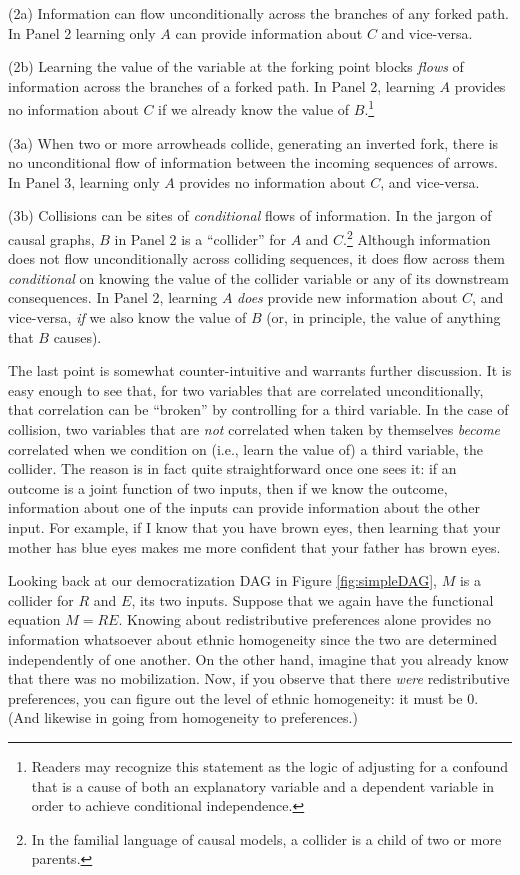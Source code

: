 \documentclass[12pt,]{book}
\let\rmarkdownfootnote\footnote%
\def\footnote{\protect\rmarkdownfootnote}
\begin{document}
(2a) Information can flow unconditionally across the branches of any forked path. In Panel 2 learning only \(A\) can provide information about \(C\) and vice-versa.

(2b) Learning the value of the variable at the forking point blocks \emph{flows} of information across the branches of a forked path. In Panel 2, learning \(A\) provides no information about \(C\) if we already know the value of \(B\).\footnote{Readers may recognize this statement as the logic of adjusting for a confound that is a cause of both an explanatory variable and a dependent variable in order to achieve conditional independence.}

(3a) When two or more arrowheads collide, generating an inverted fork, there is no unconditional flow of information between the incoming sequences of arrows. In Panel 3, learning only \(A\) provides no information about \(C\), and vice-versa.

(3b) Collisions can be sites of \emph{conditional} flows of information. In the jargon of causal graphs, \(B\) in Panel 2 is a ``collider'' for \(A\) and \(C\).\footnote{In the familial language of causal models, a collider is a child of two or more parents.} Although information does not flow unconditionally across colliding sequences, it does flow across them \emph{conditional} on knowing the value of the collider variable or any of its downstream consequences. In Panel 2, learning \(A\) \emph{does} provide new information about \(C\), and vice-versa, \emph{if} we also know the value of \(B\) (or, in principle, the value of anything that \(B\) causes).

The last point is somewhat counter-intuitive and warrants further discussion. It is easy enough to see that, for two variables that are correlated unconditionally, that correlation can be ``broken'' by controlling for a third variable. In the case of collision, two variables that are \emph{not} correlated when taken by themselves \emph{become} correlated when we condition on (i.e., learn the value of) a third variable, the collider. The reason is in fact quite straightforward once one sees it: if an outcome is a joint function of two inputs, then if we know the outcome, information about one of the inputs can provide information about the other input. For example, if I know that you have brown eyes, then learning that your mother has blue eyes makes me more confident that your father has brown eyes.

Looking back at our democratization DAG in Figure \ref{fig:simpleDAG}, \(M\) is a collider for \(R\) and \(E\), its two inputs. Suppose that we again have the functional equation \(M=RE\). Knowing about redistributive preferences alone provides no information whatsoever about ethnic homogeneity since the two are determined independently of one another. On the other hand, imagine that you already know that there was no mobilization. Now, if you observe that there \emph{were} redistributive preferences, you can figure out the level of ethnic homogeneity: it must be 0. (And likewise in going from homogeneity to preferences.)
\end{document}
